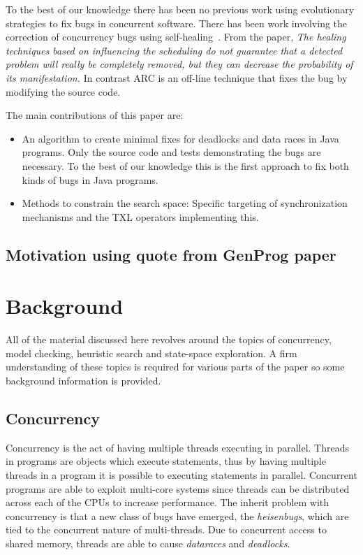 \documentclass[10pt, conference, compsocconf]{IEEEtran}
\begin{document}
To the best of our knowledge there has been no previous work using evolutionary
strategies to fix bugs in concurrent software.  There has been work involving
the correction of concurrency bugs using self-healing~\cite{LVK08}. From the
paper, \textit{The healing techniques based on influencing the scheduling do
not guarantee that a detected problem will really be completely removed, but
they can decrease the probability of its manifestation.} In contrast ARC is an
off-line technique that fixes the bug by modifying the source code.

The main contributions of this paper are:

\begin{itemize}

\item An algorithm to create minimal fixes for deadlocks and data races in Java
programs. Only the source code and tests demonstrating the bugs are necessary.
To the best of our knowledge this is the first approach to fix both kinds of
bugs in Java programs.

\item Methods to constrain the search space: Specific targeting of
synchronization mechanisms and the TXL operators implementing this.

\end{itemize}


\subsection{Motivation using quote from GenProg paper}


\section{Background}
\label{sec:background}
All of the material discussed here revolves around the topics of concurrency,
model checking, heuristic search and state-space exploration. A firm
understanding of these topics is required for various parts of the paper so
some background information is provided.

\subsection{Concurrency}
\label{sec:concurrency}
Concurrency is the act of having multiple threads executing in parallel.
Threads in programs are objects which execute statements, thus by having
multiple threads in a program it is possible to executing statements in
parallel. Concurrent programs are able to exploit multi-core systems since
threads can be distributed across each of the CPUs to increase performance.
The inherit problem with concurrency is that a new class of bugs have emerged,
the \textit{heisenbugs}, which are tied to the concurrent nature of
multi-threads. Due to concurrent access to shared memory, threads are able to
cause \textit{dataraces} and \textit{deadlocks}.
\end{document}
